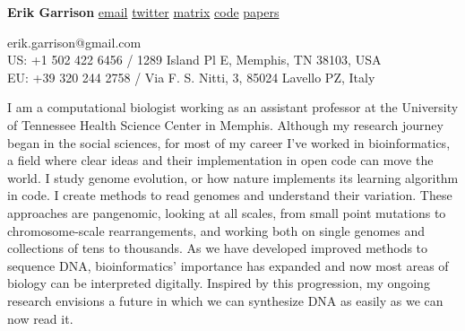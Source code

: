 \documentclass[11pt,hidelinks,letterpaper]{article}
\begin{document}
\begin{flushleft}
{\huge
  \textbf{Erik Garrison}
}
\vspace*{0.05in}
\newline
{\large
      \href{mailto:erik.garrison@gmail.com}{email}
      \href{https://twitter.com/erikgarrison}{twitter}
      \href{https://matrix.to/#/@erikgarrison:matrix.org}{matrix}
      \href{https://github.com/ekg}{code}
      \href{https://scholar.google.com/citations?user=d5TKoncAAAAJ&hl=en}{papers}
}

{\small
  erik.garrison@gmail.com \\
  US: +1 502 422 6456 /
  1289 Island Pl E, Memphis, TN 38103, USA \\
  EU: +39 320 244 2758 /
  Via F. S. Nitti, 3, 85024 Lavello PZ, Italy
}
\end{flushleft}

\begin{comment}
{\it \large
  Pangenomicist with a quantitative social science background.
  Harvard undergrad, Cambridge PhD.
  Learned in the ways of free culture.
  Sharing in the powers of free software.
  Lover of commonwealths.
  Born in Kentucky, matured in Massachusetts, honed in England.
  Lives in Tennessee and Italy, travelling the world, both physically and virtually.
}
\end{comment}


{\large
  I am a computational biologist working as an assistant professor at the University of Tennessee Health Science Center in Memphis.
  Although my research journey began in the social sciences, for most of my career I've worked in bioinformatics, a field where clear ideas and their implementation in open code can move the world.
  I study genome evolution, or how nature implements its learning algorithm in code.
  I create methods to read genomes and understand their variation.
  These approaches are pangenomic, looking at all scales, from small point mutations to chromosome-scale rearrangements, and working both on single genomes and collections of tens to thousands.
  As we have developed improved methods to sequence DNA, bioinformatics' importance has expanded and now most areas of biology can be interpreted digitally.
  Inspired by this progression, my ongoing research envisions a future in which we can synthesize DNA as easily as we can now read it.
}
\end{document}
